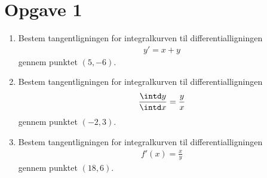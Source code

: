 \section*{Opgave 1}
\begin{enumerate}[label=\roman*)]
	\item Bestem tangentligningen for integralkurven til differentialligningen
	\begin{align*}
		y' = x + y
	\end{align*}
	gennem punktet $(5,-6)$.
	\item Bestem tangentligningen for integralkurven til differentialligningen
	\begin{align*}
		\frac{\intd y}{\intd x} = \frac{y}{x}
	\end{align*}
	gennem punktet $(-2,3)$.
	\item Bestem tangentligningen for integralkurven til differentialligningen 
	\begin{align*}
		f'(x) = \frac{x}{y} 
	\end{align*}
	gennem punktet $(18,6)$.
\end{enumerate}

